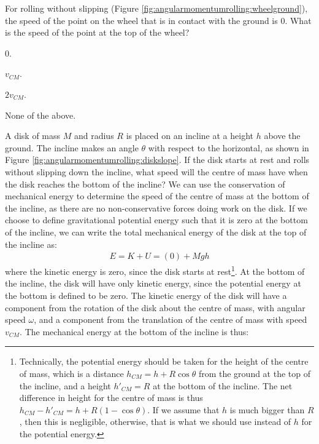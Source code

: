 \begin{checkpoint}
\begin{MCquestion}{For rolling without slipping (Figure \ref{fig:angularmomentumrolling:wheelground}), the speed of the point on the wheel that is in contact with the ground is 0. What is the speed of the point at the top of the wheel?}
\item 0.
\item $v_{CM}$.
\item $2v_{CM}$.\correct
\item None of the above.
\end{MCquestion}
\end{checkpoint}
\vspace{-0.5cm}
\begin{example}{ A disk of mass $M$ and radius $R$ is placed on an incline at a height $h$ above the ground. The incline makes an angle $\theta$ with respect to the horizontal, as shown in Figure \ref{fig:angularmomentumrolling:diskslope}. If the disk starts at rest and rolls without slipping down the incline, what speed will the centre of mass have when the disk reaches the bottom of the incline? }
We can use the conservation of mechanical energy to determine the speed of the centre of mass at the bottom of the incline, as there are no non-conservative forces doing work on the disk. If we choose to define gravitational potential energy such that it is zero at the bottom of the incline, we can write the total mechanical energy of the disk at the top of the incline as:
\begin{align*}
E = K+U=(0)+Mgh
\end{align*}
where the kinetic energy is zero, since the disk starts at rest\footnote{Technically, the potential energy should be taken for the height of the centre of mass, which is a distance $h_{CM}=h+R\cos\theta$ from the ground at the top of the incline, and a height $h'_{CM}=R$ at the bottom of the incline. The net difference in height for the centre of mass is thus $h_{CM}-h'_{CM} = h+R(1-\cos\theta)$. If we assume that $h$ is much bigger than $R$, then this is negligible, otherwise, that is what we should use instead of $h$ for the potential energy.}. At the bottom of the incline, the disk will have only kinetic energy, since the potential energy at the bottom is defined to be zero. The kinetic energy of the disk will have a component from the rotation of the disk about the centre of mass, with angular speed $\omega$, and a component from the translation of the centre of mass with speed $v_{CM}$. The mechanical energy at the bottom of the incline is thus:

\end{example}

